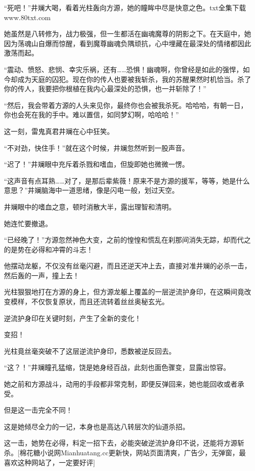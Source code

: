 
\begin{this_body}

“死吧！”井斓大喝，看着光柱轰向方源，她的瞳眸中尽是快意之色。txt全集下载www.80txt.com

她虽然是八转修为，战力极强，但一生都活在幽魂魔尊的阴影之下。在天庭中，她因为荡魂山自爆而惊醒，看到魔尊幽魂负隅顽抗，心中埋藏在最深处的情绪都因此激荡而起。

“震动、愤怒、悲悯、幸灾乐祸，还有……恐惧！幽魂啊，你曾经是如此的强悍，如今却成为天庭的囚犯。现在你的传人也要被我斩杀，我的苏醒果然时机恰当。杀了你的传人，我要把你根植在我内心最深处的恐惧，也一并斩除了！”

“然后，我会带着方源的人头来见你，最终你也会被我杀死。哈哈哈，有朝一日，你也会死在我的手中。难以置信，如同梦幻啊，哈哈哈！”

这一刻，雷鬼真君井斓在心中狂笑。

“不对劲，快住手！”就在这个时候，井斓忽然听到一股声音。

“迟了！”井斓眼中充斥着杀戮和嗜血，但旋即她也微微一愣。

“这声音有点耳熟……对了，是那后辈紫薇！原来不是方源的援军，等等，她是什么意思？”井斓脑海中一道思绪，像是闪电一般，划过天空。

井斓眼中的嗜血之意，顿时消散大半，露出理智和清明。

她连忙要撤退。

“已经晚了！”方源忽然神色大变，之前的惶惶和慌乱在刹那间消失无踪，却而代之的是势在必得和冲霄的斗志！

他摆动龙躯，不仅没有丝毫闪避，而且还逆天冲上去，直接对准井斓的必杀一击，然后轰的一声，撞上去！

光柱狠狠地打在方源的身上，但方源龙躯上覆盖的一层逆流护身印，在这瞬间竟改变模样，不仅恢复原状，而且还流转着丝丝奥秘玄光。

逆流护身印在关键时刻，产生了全新的变化！

变招！

光柱竟丝毫突破不了这层逆流护身印，悉数被逆反回去。

“这？！”井斓瞳孔猛缩，饶是她身经百战，此刻也面色骤变，显露出惊容。

她之前和方源战斗，动用的手段都非常克制，即便反弹回来，她也能回收或者承受。

但是这一击完全不同！

这是她倾尽全力的一记，本身也是高达八转层次的仙道杀招。

这一击，她势在必得，料定一招下去，必能突破逆流护身印不说，还能将方源斩杀。[棉花糖小说网Mianhuatang.cc更新快，网站页面清爽，广告少，无弹窗，最喜欢这种网站了，一定要好评]


\end{this_body}
